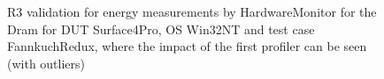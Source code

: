 \begin{figure}
                            \caption{R3 validation for energy measurements by HardwareMonitor for the Dram for DUT Surface4Pro, OS Win32NT and test case FannkuchRedux, where the impact of the first profiler can be seen (with outliers)} \label{fig:Surface4Pro_HardwareMonitor_Dram_R3_energy_with_outliers_Win32NT_avg_watts}
                            \end{figure}
                            